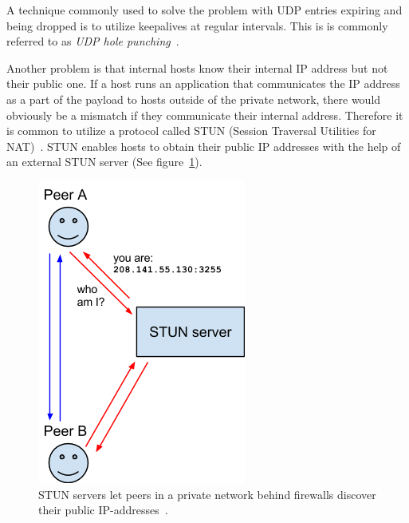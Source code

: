 A technique commonly used to solve the problem with UDP entries expiring and being dropped is to utilize keepalives at regular intervals. This is is commonly referred to as \emph{UDP hole punching}~\cite{UDPHolePunching:Online}.

Another problem is that internal hosts know their internal IP address but not their public one. If a host runs an application that communicates the IP address as a part of the payload to hosts outside of the private network, there would obviously be a mismatch if they communicate their internal address. Therefore it is common to utilize a protocol called STUN (Session Traversal Utilities for NAT)~\cite{RFC5389:Online}. STUN enables hosts to obtain their public IP addresses with the help of an external STUN server (See figure~\ref{fig:WebRTC - STUN}).

\begin{figure}[htp]
\centering
\includegraphics[width=\textwidth,height=0.2\paperheight,keepaspectratio
]{figures/webrtc-stun}
\caption{STUN servers let peers in a private network behind firewalls discover their public IP-addresses~\cite{WebRTCArchitecture:2014:Online}.}
\label{fig:WebRTC - STUN}
\end{figure}

